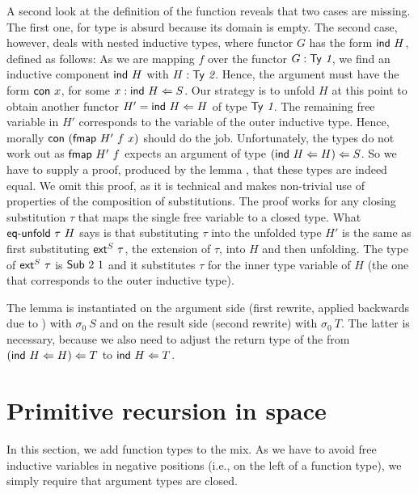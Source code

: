 \documentclass[a4paper,USenglish,cleveref, autoref, thm-restate]{lipics-v2021}
\begin{document}
A second look at the definition of the {\Afmap} function reveals that
two cases are missing. The first one, for type {\ATZ} is absurd
because its domain is empty. The second case, however, deals with
nested inductive types, where functor $G$ has the form $\Aind~H$, defined as follows:
\ccFunFmapSignature
\vspace{-1.5\baselineskip}
\ccFunFmapInd
As we are mapping $f$ over the functor $G : \ATy{~1}$, we find an
inductive component $\Aind~H$ with $H : \ATy{~2}$. Hence, the argument
must have the form $\Acon\ x$, for some $x : \Aind~H \Leftarrow S$.
Our strategy is to unfold $H$ at this point to obtain another functor
$H' = \Aind~H \Leftarrow H$ of type $\ATy{~1}$. The remaining free variable in $H'$
corresponds to the variable of the outer inductive type. Hence,
morally $\Acon~ (\Afmap~H'~f~x)$ should do the job. Unfortunately,
the types do not work out as $\Afmap~H'~f$ expects an argument of type
$(\Aind~H \Leftarrow H) \Leftarrow S$. So we have to supply a proof,
produced by the lemma \Aeq, that these types are indeed equal.
\ccEqUnfold
We omit this proof, as it is technical and makes non-trivial
use of properties of the composition of substitutions.
The proof works for any closing substitution $\tau$ that maps the
single free variable to a closed type. What {$\Aeq~\tau~H$} says is 
that substituting $\tau$ into the unfolded type $H'$ is the same as
first substituting $\Aext^S\ \tau$, the extension of $\tau$, into
$H$ and then unfolding. The type of $\Aext^S\ \tau$ is $\ASub~2~1$ and
it substitutes $\tau$ for the inner type variable of $H$ (the one that
corresponds to the outer inductive type). 

The {\Aeq} lemma is instantiated on the argument side (first rewrite,
applied backwards due to \Asym) with $\sigma_0~S$ and on the result
side (second rewrite) with $\sigma_0~T$. The latter is necessary, because we also need
to adjust the return type of the {\Afmap} from $(\Aind~H \Leftarrow H)
\Leftarrow T$ to $\Aind~H \Leftarrow T$. 


\section{Primitive recursion in space}
\label{sec:prim-recurs-space}


In this section, we add function types to the mix. As we have to avoid
free inductive variables in negative positions (i.e., on the left of a
function type), we simply require that argument types are closed.
\cccDataTy
\end{document}
